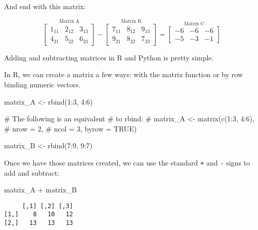 \documentclass[
]{krantz}
\newenvironment{Shaded}{\begin{snugshade}}{\end{snugshade}}
\newcommand{\CommentTok}[1]{\textcolor[rgb]{0.37,0.37,0.37}{#1}}
\newcommand{\DecValTok}[1]{\textcolor[rgb]{0.68,0.00,0.00}{#1}}
\newcommand{\FunctionTok}[1]{\textcolor[rgb]{0.28,0.35,0.67}{#1}}
\newcommand{\NormalTok}[1]{\textcolor[rgb]{0.00,0.23,0.31}{#1}}
\newcommand{\OtherTok}[1]{\textcolor[rgb]{0.00,0.23,0.31}{#1}}
\newcommand{\SpecialCharTok}[1]{\textcolor[rgb]{0.37,0.37,0.37}{#1}}
\begin{document}
And end with this matrix:

\[
\stackrel{\mbox{Matrix A}}{
\begin{bmatrix}
1_{11} & 2_{12} & 3_{13}\\
4_{21} & 5_{22} & 6_{23}
\end{bmatrix}
}
-
\stackrel{\mbox{Matrix B}}{
\begin{bmatrix}
7_{11} & 8_{12} & 9_{13}\\
9_{21} & 8_{22} & 7_{23}
\end{bmatrix} 
}
=
\stackrel{\mbox{Matrix C}}{
\begin{bmatrix}
-6 & -6 & -6 \\
-5 & -3 & -1
\end{bmatrix}
}
\]

Adding and subtracting matrices in R and Python is pretty simple.

In R, we can create a matrix a few ways: with the matrix function or by
row binding numeric vectors.

\begin{Shaded}
\begin{Highlighting}[]
\NormalTok{matrix\_A }\OtherTok{\textless{}{-}} \FunctionTok{rbind}\NormalTok{(}\DecValTok{1}\SpecialCharTok{:}\DecValTok{3}\NormalTok{, }
                  \DecValTok{4}\SpecialCharTok{:}\DecValTok{6}\NormalTok{)}

\CommentTok{\# The following is an equivalent}
\CommentTok{\# to rbind:}
\CommentTok{\# matrix\_A \textless{}{-} matrix(c(1:3, 4:6), }
\CommentTok{\#                    nrow = 2, }
\CommentTok{\#                    ncol = 3, byrow = TRUE)}

\NormalTok{matrix\_B }\OtherTok{\textless{}{-}} \FunctionTok{rbind}\NormalTok{(}\DecValTok{7}\SpecialCharTok{:}\DecValTok{9}\NormalTok{, }
                  \DecValTok{9}\SpecialCharTok{:}\DecValTok{7}\NormalTok{)}
\end{Highlighting}
\end{Shaded}

Once we have those matrices created, we can use the standard \texttt{+}
and \texttt{-} signs to add and subtract:

\begin{Shaded}
\begin{Highlighting}[]
\NormalTok{matrix\_A }\SpecialCharTok{+}\NormalTok{ matrix\_B}
\end{Highlighting}
\end{Shaded}

\begin{verbatim}
     [,1] [,2] [,3]
[1,]    8   10   12
[2,]   13   13   13
\end{verbatim}
\end{document}
